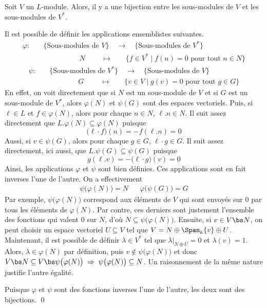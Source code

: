 \begin{Lem} Soit $V$ un $L$-module. Alors, il y a une bijection entre les sous-modules de $V$ et les sous-modules de $V^*$.
\begin{pre} Il est possible de définir les applications ensemblistes suivantes.
\begin{align*}
\varphi : \quad &\{\text{Sous-modules de } V\} \quad \longrightarrow \quad \{\text{Sous-modules de } V^*\}\\
&\qquad\qquad\quad N \;\qquad \longmapsto \quad\;\;\; \{f \in V^* \; | \; f(n) = 0 \text{ pour tout } n \in N\}
\end{align*}
\begin{align*}
\psi : \quad &\{\text{Sous-modules de } V^*\} \quad \longrightarrow \quad \{\text{Sous-modules de } V\}\\
&\qquad\qquad G \;\qquad \longmapsto \quad\;\;\; \{v \in V \; | \; g(v) = 0 \text{ pour tout } g \in G\}
\end{align*}
En effet, on voit directement que si $N$ est un sous-module de $V$ et si $G$ est un sous-module de $V^*$, alors $\varphi(N)$ et $\psi(G)$ sont des espaces vectoriels. Puis, si $\ell \in L$ et $f \in \varphi(N)$, alors pour chaque $n \in N$, $\ell.n \in N$. Il suit assez directement que $L.\varphi(N) \subseteq \varphi(N)$ puisque
$$ \big(\ell \cdot f\big)(n) = - f(\ell.n) = 0 $$
Aussi, si $v \in \psi(G)$, alors pour chaque $g \in G$, $\ell \cdot g \in G$. Il suit assez directement, ici aussi, que $L.\psi(G) \subseteq \psi(G)$ puisque
$$ g (\ell.v) = - \big(\ell \cdot g\big)(v) = 0 $$
Ainsi, les applications $\varphi$ et $\psi$ sont bien définies. Ces applications sont en fait inverses l'une de l'autre. On a effectivement
\begin{align*}
\psi\big(\varphi(N)\big) = N && \varphi\big(\psi(G)\big) = G
\end{align*}
Par exemple, $\psi\big(\varphi(N)\big)$ correspond aux éléments de $V$ qui sont envoyés sur $0$ par tous les éléments de $\varphi(N)$. Par contre, ces derniers sont justement l'ensemble des fonctions qui valent $0$ sur $N$, d'où $N \subseteq \psi\big(\varphi(N)\big)$. Ensuite, si $v \in V \bs N$, on peut choisir un espace vectoriel $U \subseteq V$ tel que $V = N \oplus \Span_k\{v\} \oplus U$. Maintenant, il est possible de définir $\lambda \in V^*$ tel que $\lambda|_{N \oplus U} = 0$ et $\lambda(v) = 1$. Alors, $\lambda \in \varphi(N)$ par définition, puis $v \notin \psi\big(\varphi(N)\big)$ et donc $V \bs N \subseteq V \bs \psi\big(\varphi(N)\big) \; \Rightarrow \; \psi\big(\varphi(N)\big) \subseteq N$. Un raisonnement de la même nature justifie l'autre égalité.

Puisque $\varphi$ et $\psi$ sont des fonctions inverses l'une de l'autre, les deux sont des bijections. \qed
\end{pre}
\end{Lem}

